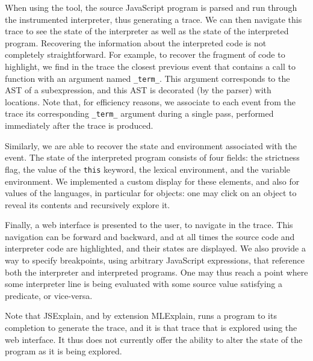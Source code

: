 \documentclass[twocolumn,a4paper]{article} \usepackage[utf8]{inputenc}
\begin{document}
When using the tool, the source JavaScript program is parsed and run through the
instrumented interpreter, thus generating a trace. We can then navigate this
trace to see the state of the interpreter as well as the state of the
interpreted program. Recovering the information about the interpreted code is
not completely straightforward. For example, to recover the fragment of code to
highlight, we find in the trace the closest previous event that contains a call
to function with an argument named \texttt{\_term\_}. This argument corresponds
to the AST of a subexpression, and this AST is decorated (by the parser) with
locations. Note that, for efficiency reasons, we associate to each event from
the trace its corresponding \texttt{\_term\_} argument during a single pass,
performed immediately after the trace is produced.

Similarly, we are able to recover the state and environment associated with the
event. The state of the interpreted program consists of four fields: the
strictness flag, the value of the \texttt{this} keyword, the lexical
environment, and the variable environment. We implemented a custom display for
these elements, and also for values of the languages, in particular for objects:
one may click on an object to reveal its contents and recursively explore it.

Finally, a web interface is presented to the user, to navigate in the trace.
This navigation can be forward and backward, and at all times the source code
and interpreter code are highlighted, and their states are displayed. We also
provide a way to specify breakpoints, using arbitrary JavaScript expressions,
that reference both the interpreter and interpreted programs. One may thus reach
a point where some interpreter line is being evaluated with some source value
satisfying a predicate, or vice-versa.

Note that JSExplain, and by extension MLExplain, runs a program to its
completion to generate the trace, and it is that trace that is explored using
the web interface. It thus does not currently offer the ability to alter the
state of the program as it is being explored.
\end{document}
